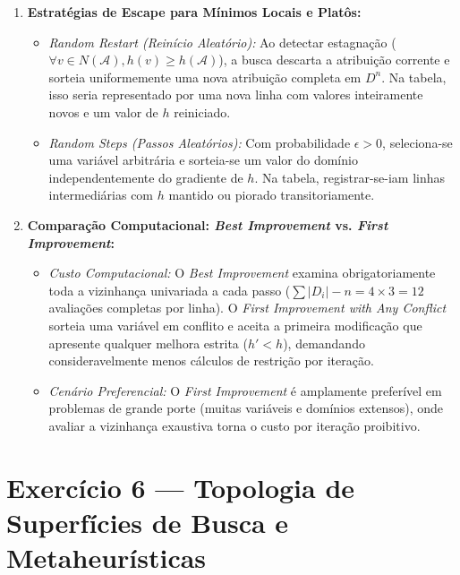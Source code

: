 \begin{enumerate}[label=(\alph*)]
    \item \textbf{Estratégias de Escape para Mínimos Locais e Platôs:}
    \begin{itemize}
        \item \textit{Random Restart (Reinício Aleatório):} Ao detectar estagnação ($\forall v \in N(\mathcal{A}), h(v) \ge h(\mathcal{A})$), a busca descarta a atribuição corrente e sorteia uniformemente uma nova atribuição completa em $D^n$. Na tabela, isso seria representado por uma nova linha com valores inteiramente novos e um valor de $h$ reiniciado.
        \item \textit{Random Steps (Passos Aleatórios):} Com probabilidade $\epsilon > 0$, seleciona-se uma variável arbitrária e sorteia-se um valor do domínio independentemente do gradiente de $h$. Na tabela, registrar-se-iam linhas intermediárias com $h$ mantido ou piorado transitoriamente.
    \end{itemize}

    \item \textbf{Comparação Computacional: \textit{Best Improvement} vs. \textit{First Improvement}:}
    \begin{itemize}
        \item \textit{Custo Computacional:} O \textit{Best Improvement} examina obrigatoriamente toda a vizinhança univariada a cada passo ($\sum |D_i| - n = 4 \times 3 = 12$ avaliações completas por linha). O \textit{First Improvement with Any Conflict} sorteia uma variável em conflito e aceita a primeira modificação que apresente qualquer melhora estrita ($h' < h$), demandando consideravelmente menos cálculos de restrição por iteração.
        \item \textit{Cenário Preferencial:} O \textit{First Improvement} é amplamente preferível em problemas de grande porte (muitas variáveis e domínios extensos), onde avaliar a vizinhança exaustiva torna o custo por iteração proibitivo.
    \end{itemize}
\end{enumerate}

\section{Exercício 6 — Topologia de Superfícies de Busca e Metaheurísticas}

